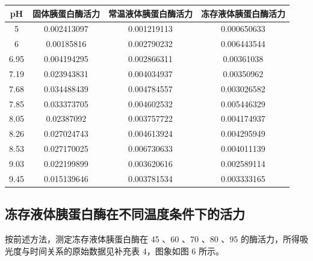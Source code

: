 \documentclass[11pt,UTF8]{ctexart}
\begin{document}
        \small
        \begin{center}
        \begin{tabular}{cccc}
            \centering
            \toprule  %
            pH& 固体胰蛋白酶活力 & 常温液体胰蛋白酶活力 & 冻存液体胰蛋白酶活力 \\
            \midrule  %
            5 & 0.002413097 & 0.001219113 & 0.000650633 \\
            6 & 0.00185816 & 0.002790232 & 0.006443544 \\
            6.95 & 0.004194295 & 0.002866311 & 0.00361038 \\
            7.19 & 0.023943831 & 0.004034937 & 0.00350962 \\
            7.68 & 0.034488439 & 0.004784557 & 0.003026582 \\
            7.85 & 0.033373705 & 0.004602532 & 0.005446329 \\
            8.05 & 0.02387092 & 0.003757722 & 0.004174937 \\
            8.26 & 0.027024743 & 0.004613924 & 0.004295949 \\
            8.53 & 0.027170025 & 0.006730633 & 0.004011139 \\
            9.03 & 0.022199899 & 0.003620616 & 0.002589114 \\
            9.45 & 0.015139646 & 0.003781534 & 0.003333165 \\
            \bottomrule %
        \end{tabular}
        \end{center}
        \normalsize

    \subsection{冻存液体胰蛋白酶在不同温度条件下的活力}
    按前述方法，测定冻存液体胰蛋白酶在 45 \textcelsius、60 \textcelsius、70 \textcelsius、80 \textcelsius、95 \textcelsius 的酶活力，所得吸光度与时间关系的原始数据见补充表 4，图象如图 6 所示。
\end{document}
